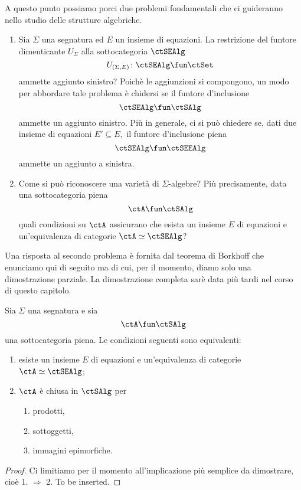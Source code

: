 A questo punto possiamo porci due problemi fondamentali che ci guideranno nello studio delle strutture algebriche.
\begin{enumerate}
\item Sia $\Sigma$ una segnatura ed $E$ un insieme di equazioni. La restrizione del funtore dimenticante $U_{\Sigma}$
alla sottocategoria $\ctSEAlg$ 
$$U_{(\Sigma,E)} \colon \ctSEAlg \fun \ctSet$$
ammette aggiunto sinistro? Poichè le aggiunzioni si compongono, un modo per abbordare tale problema è chidersi 
se il funtore d'inclusione
$$\ctSEAlg \fun \ctSAlg$$
ammette un aggiunto sinistro. Più in generale, ci si può chiedere se, dati due insieme di equazioni $E' \subseteq E,$
il funtore d'inclusione piena
$$\ctSEAlg \fun \ctSEEAlg$$
ammette un aggiunto a sinistra.
\item Come si può riconoscere una varietà di $\Sigma$-algebre? Più precisamente, data una sottocategoria piena 
$$\ctA \fun \ctSAlg$$
quali condizioni su $\ctA$ assicurano che esista un insieme $E$ di equazioni e un'equivalenza di categorie $\ctA \simeq \ctSEAlg$?
\end{enumerate}

Una risposta al secondo problema è fornita dal teorema di Borkhoff che enunciamo qui di seguito ma di cui, per il momento,
diamo solo una dimostrazione parziale. La dimostrazione completa sarè data più tardi nel corso di questo capitolo.

\begin{theorem}\label{teo_Birkhoff_v1}
Sia $\Sigma$ una segnatura e sia
$$\ctA \fun \ctSAlg$$
una sottocategoria piena. Le condizioni seguenti sono equivalenti:
\begin{enumerate}
\item esiste un insieme $E$ di equazioni e un'equivalenza di categorie $\ctA \simeq \ctSEAlg$;
\item $\ctA$ è chiusa in $\ctSAlg$ per
\begin{enumerate}
\item prodotti,
\item sottoggetti,
\item immagini epimorfiche.
\end{enumerate}
\end{enumerate}
\end{theorem} 

\begin{proof} 
Ci limitiamo per il momento all'implicazione più semplice da dimostrare, cioè 1. $\Rightarrow$ 2. To be inserted.
\end{proof} 

